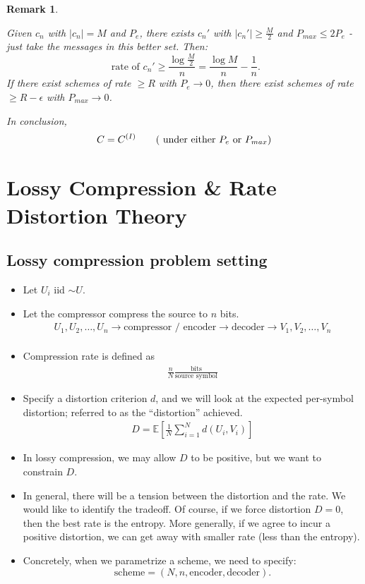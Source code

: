 \documentclass[12pt]{extarticle}
\newtheorem*{remark}{Remark}
\newcommand{\EE}{\mathbb{E}}
\newcommand{\eps}{\epsilon}
\newcommand{\T}{\text}
\begin{document}
\begin{remark}
\begin{enumerate}
      Given $c_n$ with $|c_n| = M$ and $P_e$, there exists $c_n'$ with $|c_n'| \geq \frac{M}{2}$ and $P_{max} \leq 2 P_e$ - just take the messages in this better set.  Then:
      \[
        \text{ rate of $c_n'$} \geq \frac{\log \frac{M}{2}}{n} = \frac{\log M}{n} - \frac{1}{n}.
      \]
      If there exist schemes of rate $\geq R$ with $P_e \to 0$, then there exist schemes of rate $\geq R - \eps$ with $P_{max} \to 0$.

      In conclusion, 
      \[
        C = C^{(I)} \tag{ under either $P_e$ or $P_{max}$}
      \]
  \end{enumerate}
\end{remark}

\section{Lossy Compression \& Rate Distortion Theory}

\subsection{Lossy compression problem setting}

\begin{itemize}
  \item Let $U_i$ iid $\sim U$.
  \item Let the compressor compress the source to $n$ bits.
\begin{align*}
  U_1, U_2, \dots, U_n \to \T{compressor / encoder} \to \T{decoder} \to V_1, V_2, \dots, V_n \\
\end{align*}
  \item Compression rate is defined as
    \begin{align*}
      \frac{n}{N} \frac{\T{bits}}{\T{source symbol}}
    \end{align*}
  \item Specify a distortion criterion $d$, and we will look at the expected per-symbol distortion; referred to as the ``distortion'' achieved.
    \begin{align*}
      D = \EE \left [ \frac{1}{N} \sum_{i=1}^{N} d(U_i, V_i) \right ]
    \end{align*}
  \item In lossy compression, we may allow $D$ to be positive, but we want to constrain $D$.
  \item In general, there will be a tension between the distortion and the rate.  We would like to identify the tradeoff.  Of course, if we force distortion $D = 0$, then the best rate is the entropy.  More generally, if we agree to incur a positive distortion, we can get away with smaller rate (less than the entropy).
  \item Concretely, when we parametrize a scheme, we need to specify:
    \[
      \T{scheme} = (N, n, \T{encoder}, \T{decoder}).
    \]
\end{itemize}
\end{document}
